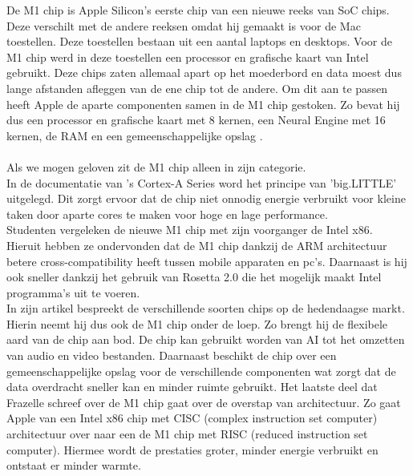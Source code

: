 \documentclass{hogent-article}
\begin{document}


De M1 chip is Apple Silicon's eerste chip van een nieuwe reeks van SoC chips. Deze verschilt met de andere reeksen omdat hij gemaakt is voor de Mac toestellen. Deze toestellen bestaan uit een aantal laptops en desktops. Voor de M1 chip werd in deze toestellen een processor en grafische kaart van Intel gebruikt. Deze chips zaten allemaal apart op het moederbord en data moest dus lange afstanden afleggen van de ene chip tot de andere. Om dit aan te passen heeft Apple de aparte componenten samen in de M1 chip gestoken. Zo bevat hij dus een processor en grafische kaart met 8 kernen, een Neural Engine met 16 kernen, de RAM en een gemeenschappelijke opslag \autocite{Apple2020}.
\\
\\
Als we \textcite{Apple2020} mogen geloven zit de M1 chip alleen in zijn categorie.  \\
In de documentatie van \textcite{ARM2014}'s Cortex-A Series word het principe van 'big.LITTLE' uitgelegd. Dit zorgt ervoor dat de chip niet onnodig energie verbruikt voor kleine taken door aparte cores te maken voor hoge en lage performance. \\
Studenten \textcite{Dalakoti2022} vergeleken de nieuwe M1 chip met zijn voorganger de Intel x86. Hieruit hebben ze ondervonden dat de M1 chip dankzij de ARM architectuur betere cross-compatibility heeft tussen mobile apparaten en pc's. Daarnaast is hij ook sneller dankzij het gebruik van Rosetta 2.0 die het mogelijk maakt Intel programma's uit te voeren. \\
In zijn artikel bespreekt \textcite{Frazelle2021} de verschillende soorten chips op de hedendaagse markt. Hierin neemt hij dus ook de M1 chip onder de loep. Zo brengt hij de flexibele aard van de chip aan bod. De chip kan gebruikt worden van AI tot het omzetten van audio en video bestanden. Daarnaast beschikt de chip over een gemeenschappelijke opslag voor de verschillende componenten wat zorgt dat de data overdracht sneller kan en minder ruimte gebruikt. Het laatste deel dat Frazelle schreef over de M1 chip gaat over de overstap van architectuur. Zo gaat Apple van een Intel x86 chip met CISC (complex instruction set computer) architectuur over naar een de M1 chip met RISC (reduced instruction set computer). Hiermee wordt de prestaties groter, minder energie verbruikt en ontstaat er minder warmte. \\
\end{document}
